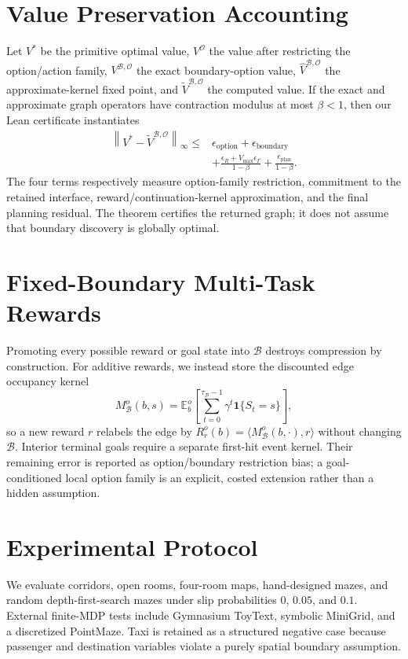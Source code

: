 \documentclass[10pt]{article}
\newcommand{\B}{\mathcal{B}}
\newcommand{\Oset}{\mathcal{O}}
\newcommand{\norm}[1]{\left\lVert #1 \right\rVert_{\infty}}
\begin{document}
\section{Value Preservation Accounting}
Let $V^*$ be the primitive optimal value, $V^{\Oset}$ the value after restricting
the option/action family, $V^{\B,\Oset}$ the exact boundary-option value,
$\widehat V^{\B,\Oset}$ the approximate-kernel fixed point, and
$\widetilde V^{\B,\Oset}$ the computed value. If the exact and approximate
graph operators have contraction modulus at most $\beta<1$, then our Lean
certificate instantiates
\begin{align}
\norm{V^*-\widetilde V^{\B,\Oset}}
\leq{}& \epsilon_{\mathrm{option}}+\epsilon_{\mathrm{boundary}}\\
&+\frac{\epsilon_R+V_{\max}\epsilon_\Gamma}{1-\beta}
+\frac{\epsilon_{\mathrm{plan}}}{1-\beta}.
\end{align}
The four terms respectively measure option-family restriction, commitment to
the retained interface, reward/continuation-kernel approximation, and the final
planning residual. The theorem certifies the returned graph; it does not assume
that boundary discovery is globally optimal.

\section{Fixed-Boundary Multi-Task Rewards}
Promoting every possible reward or goal state into $\B$ destroys compression by
construction. For additive rewards, we instead store the discounted edge
occupancy kernel
\begin{equation}
M^o_\B(b,s)=\mathbb{E}_b^o\left[\sum_{t=0}^{\tau_\B-1}
\gamma^t\mathbf{1}\{S_t=s\}\right],
\end{equation}
so a new reward $r$ relabels the edge by
$R_r^o(b)=\langle M^o_\B(b,\cdot),r\rangle$ without changing $\B$.
Interior terminal goals require a separate first-hit event kernel. Their
remaining error is reported as option/boundary restriction bias; a
goal-conditioned local option family is an explicit, costed extension rather
than a hidden assumption.

\section{Experimental Protocol}
We evaluate corridors, open rooms, four-room maps, hand-designed mazes, and
random depth-first-search mazes under slip probabilities $0$, $0.05$, and
$0.1$. External finite-MDP tests include Gymnasium ToyText, symbolic MiniGrid,
and a discretized PointMaze. Taxi is retained as a structured negative case
because passenger and destination variables violate a purely spatial boundary
assumption.
\end{document}
